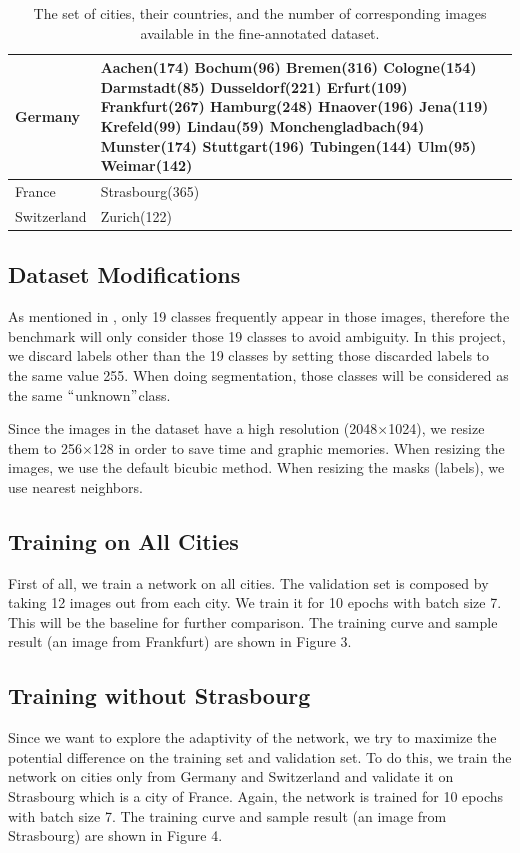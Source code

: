 \documentclass[10pt,twocolumn,letterpaper]{article}
\begin{document}
\begin{table}[h]
\begin{center}
	\begin{tabular}{ | l | p{4.6cm} | }
		\hline
		Germany & Aachen(174) Bochum(96) Bremen(316) Cologne(154)
		Darmstadt(85) Dusseldorf(221) Erfurt(109) Frankfurt(267) Hamburg(248) Hnaover(196) Jena(119) Krefeld(99) Lindau(59) Monchengladbach(94) Munster(174) Stuttgart(196) Tubingen(144) Ulm(95) Weimar(142)\\ \hline
		France & Strasbourg(365)\\ \hline
		Switzerland & Zurich(122)\\
		\hline
	\end{tabular}
\end{center}
\caption{The set of cities, their countries, and the number of corresponding images available in the fine-annotated dataset.} \label{tab:table1}
\end{table}

\subsection{Dataset Modifications}
As mentioned in \cite{Cordts2016Cityscapes}, only 19 classes frequently appear in those images, therefore the benchmark will only consider those 19 classes to avoid ambiguity. In this project, we discard labels other than the 19 classes by setting those discarded labels to the same value 255. When doing segmentation, those classes will be considered as the same $``$unknown$"$class.

Since the images in the dataset have a high resolution (2048$\times$1024), we resize them to 256$\times$128 in order to save time and graphic memories. When resizing the images, we use the default bicubic method. When resizing the masks (labels), we use nearest neighbors.

\subsection{Training on All Cities}
First of all, we train a network on all cities. The validation set is composed by taking 12 images out from each city. We train it for 10 epochs with batch size 7. This will be the baseline for further comparison. The training curve and sample result (an image from Frankfurt) are shown in Figure 3.

\subsection{Training without Strasbourg}
Since we want to explore the adaptivity of the network, we try to maximize the potential difference on the training set and validation set. To do this, we train the network on cities only from Germany and Switzerland and validate it on Strasbourg which is a city of France. Again, the network is trained for 10 epochs with batch size 7. The training curve and sample result (an image from Strasbourg) are shown in Figure 4.
\end{document}
